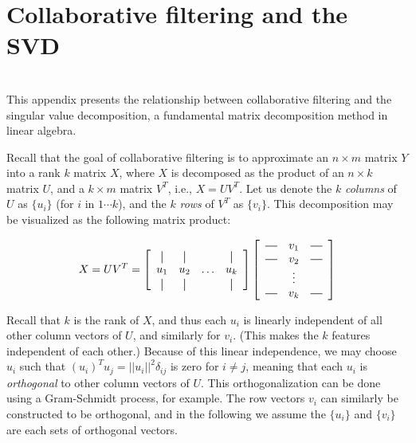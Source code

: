 \section{Collaborative filtering and the SVD}
\label{app:collab_filter}

~\\

This appendix presents the relationship between collaborative filtering
and the singular value decomposition, a fundamental matrix
decomposition method in linear algebra.

Recall that the goal of collaborative filtering is to approximate an
$n\times m$ matrix $Y$ into a rank $k$ matrix $X$, where $X$ is decomposed as the product of an $n\times k$ matrix $U$,
and a $k\times m$ matrix $V^T$, i.e., $X = UV^T$.  Let us denote the
$k$ {\em columns} of $U$ as $\{u_i\}$ (for $i$ in $1\cdots k$), and
the $k$ {\em rows} of $V^T$ as $\{v_i\}$.  This decomposition may be
visualized as the following matrix product:

\newcommand*{\vertbar}{\rule[-1ex]{0.5pt}{2.5ex}}
\newcommand*{\horzbar}{\rule[.5ex]{2.5ex}{0.5pt}}

\begin{eqnarray}
X = U V^T = 
\left[
  \begin{array}{cccc}
    \vertbar & \vertbar &        & \vertbar \\
    u_{1}    & u_{2}    & \ldots & u_{k}    \\
    \vertbar & \vertbar &        & \vertbar 
  \end{array}
\right]
\left[
  \begin{array}{ccc}
    \horzbar & v_{1} & \horzbar \\
    \horzbar & v_{2} & \horzbar \\
             & \vdots    &          \\
    \horzbar & v_{k} & \horzbar
  \end{array}
\right]
\end{eqnarray}

Recall that $k$ is the rank of $X$, and thus each $u_i$ is linearly
independent of all other column vectors of $U$, and similarly for
$v_i$.  (This makes the $k$ features independent of each other.)
Because of this linear independence, we may choose $u_i$ such that
$(u_i)^T u_j = ||u_i||^2 \delta_{ij}$ is zero for $i\neq j$, meaning
that each $u_i$ is {\em orthogonal} to other column vectors of $U$.
This orthogonalization can be done using a Gram-Schmidt process, for
example.  The row vectors $v_i$ can similarly be constructed to be
orthogonal, and in the following we assume the $\{u_i\}$ and $\{v_i\}$ are
each sets of orthogonal vectors.

